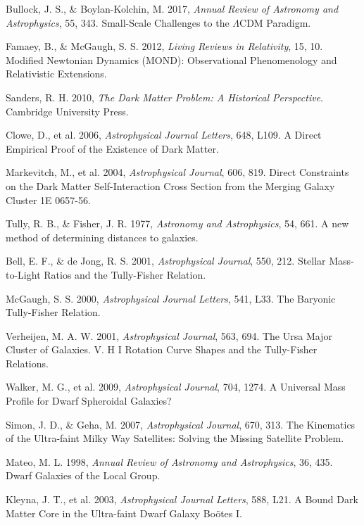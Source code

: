 \documentclass[12pt,a4paper]{article}
\begin{document}
\begin{thebibliography}{99}
 Bullock, J. S., \& Boylan-Kolchin, M. 2017, \textit{Annual Review of Astronomy and Astrophysics}, 55, 343. Small-Scale Challenges to the $\Lambda$CDM Paradigm.

 Famaey, B., \& McGaugh, S. S. 2012, \textit{Living Reviews in Relativity}, 15, 10. Modified Newtonian Dynamics (MOND): Observational Phenomenology and Relativistic Extensions.

 Sanders, R. H. 2010, \textit{The Dark Matter Problem: A Historical Perspective}. Cambridge University Press.

 Clowe, D., et al. 2006, \textit{Astrophysical Journal Letters}, 648, L109. A Direct Empirical Proof of the Existence of Dark Matter.

 Markevitch, M., et al. 2004, \textit{Astrophysical Journal}, 606, 819. Direct Constraints on the Dark Matter Self-Interaction Cross Section from the Merging Galaxy Cluster 1E 0657-56.

 Tully, R. B., \& Fisher, J. R. 1977, \textit{Astronomy and Astrophysics}, 54, 661. A new method of determining distances to galaxies.

 Bell, E. F., \& de Jong, R. S. 2001, \textit{Astrophysical Journal}, 550, 212. Stellar Mass-to-Light Ratios and the Tully-Fisher Relation.

 McGaugh, S. S. 2000, \textit{Astrophysical Journal Letters}, 541, L33. The Baryonic Tully-Fisher Relation.

 Verheijen, M. A. W. 2001, \textit{Astrophysical Journal}, 563, 694. The Ursa Major Cluster of Galaxies. V. H I Rotation Curve Shapes and the Tully-Fisher Relations.

 Walker, M. G., et al. 2009, \textit{Astrophysical Journal}, 704, 1274. A Universal Mass Profile for Dwarf Spheroidal Galaxies?

 Simon, J. D., \& Geha, M. 2007, \textit{Astrophysical Journal}, 670, 313. The Kinematics of the Ultra-faint Milky Way Satellites: Solving the Missing Satellite Problem.

 Mateo, M. L. 1998, \textit{Annual Review of Astronomy and Astrophysics}, 36, 435. Dwarf Galaxies of the Local Group.

 Kleyna, J. T., et al. 2003, \textit{Astrophysical Journal Letters}, 588, L21. A Bound Dark Matter Core in the Ultra-faint Dwarf Galaxy Boötes I.


\end{thebibliography}
\end{document}
